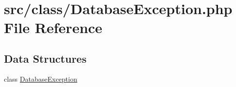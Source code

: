 \hypertarget{_database_exception_8php}{}\section{src/class/\+Database\+Exception.php File Reference}
\label{_database_exception_8php}
\subsection*{Data Structures}
\begin{DoxyCompactItemize}
\item 
class \hyperlink{class_database_exception}{Database\+Exception}
\end{DoxyCompactItemize}
